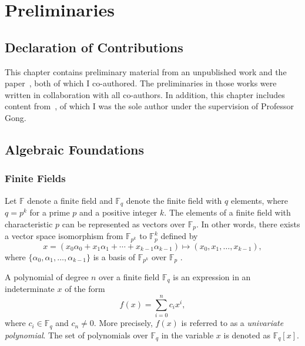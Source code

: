 \chapter{Preliminaries} \label{ch:preliminaries}

\section*{Declaration of Contributions}
This chapter contains preliminary material from an unpublished work and the paper~\cite{Badakhshan2025Ursa}, both of which I co-authored. The preliminaries in those works were written in collaboration with all co-authors. In addition, this chapter includes content from~\cite{Badakhshan2024Zupply}, of which I was the sole author under the supervision of Professor Gong.


\section{Algebraic Foundations}

\subsection{Finite Fields}\label{sec:prel_finite_field}
Let $\mathbb{F}$ denote a finite field and $\mathbb{F}_q$ denote the finite field with $q$ elements, where $q=p^k$ for a prime $p$ and a positive integer $k$. The elements of a finite field with characteristic $p$ can be represented as vectors over $\mathbb{F}_p$. In other words, there exists a vector space isomorphism from $\mathbb{F}_{p^k}$ to $\mathbb{F}_p^k$ defined by $$x=(x_0\alpha_0+x_1\alpha_1+ \cdots +x_{k-1}\alpha_{k-1}) \mapsto (x_0,x_1, \ldots,x_{k-1}),$$ where $\{\alpha_{0},\alpha_{1},\ldots,\alpha_{k-1}\}$ is a basis of $\mathbb{F}_{p^k}$ over $\mathbb{F}_p$ \cite{samanta2023thesis}.

A polynomial of degree $n$ over a finite field $\mathbb{F}_{q}$ is an expression in an indeterminate $x$ of the form
\[
f(x) = \sum_{i=0}^{n} c_i x^i,
\]
where $c_i \in \mathbb{F}_{q}$ and $c_n \neq 0$. More precisely, $f(x)$ is referred to as a \textit{univariate polynomial}. The set of polynomials over $\mathbb{F}_{q}$ in the variable $x$ is denoted as $\mathbb{F}_{q}[x]$. 

